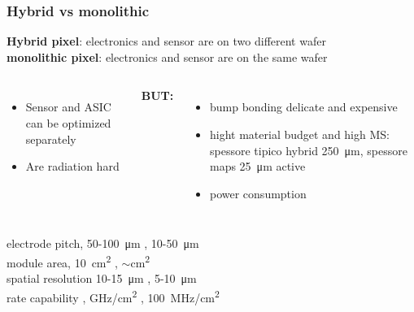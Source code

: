     \begin{frame}
        \frametitle{Hybrid vs monolithic}
        \textbf{Hybrid pixel}: electronics and sensor are on two different wafer\\
        \textbf{monolithic pixel}: electronics and sensor are on the same wafer\\ 
        \begin{columns}
                \begin{itemize}
                    \item Sensor and ASIC can be optimized separately
                    \item Are radiation hard
                \end{itemize}
                \textbf{BUT: }
                \begin{itemize}
                    \item bump bonding delicate and expensive
                    \item hight material budget and high MS: spessore tipico hybrid \SI{250}{\um}, spessore maps \SI{25}{\um} active
                    \item power consumption
                \end{itemize}
        \end{columns}
        electrode pitch,  50-\SI{100}{\um} , 10-\SI{50}{\um}\\
        module area, \SI{10}{cm\squared} , $\sim$\si{cm\squared}\\
        spatial resolution  10-\SI{15}{\um} , 5-\SI{10}{\um}\\
                rate capability , \si{GHz/cm\squared} , \SI{100}{MHz/cm\squared} \\
    \end{frame}